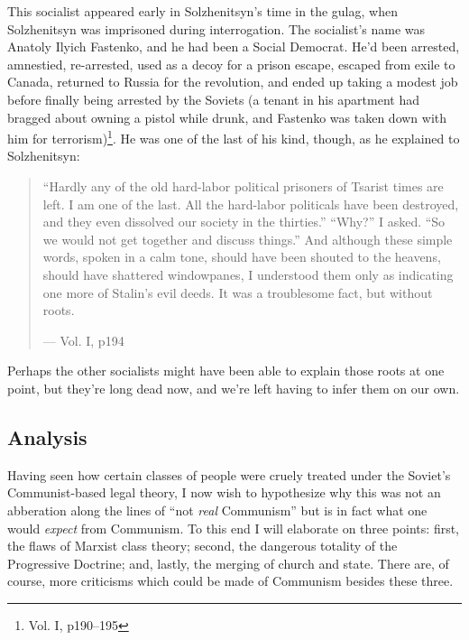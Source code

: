 \documentclass{article}
\begin{document}
This socialist appeared early in Solzhenitsyn's time in the gulag, when Solzhenitsyn was imprisoned during interrogation.  The socialist's name was Anatoly Ilyich Fastenko, and he had been a Social Democrat.  He'd been arrested, amnestied, re-arrested, used as a decoy for a prison escape, escaped from exile to Canada, returned to Russia for the revolution, and ended up taking a modest job before finally being arrested by the Soviets (a tenant in his apartment had bragged about owning a pistol while drunk, and Fastenko was taken down with him for terrorism)\footnote{Vol. I, p190--195}.  He was one of the last of his kind, though, as he explained to Solzhenitsyn:

\begin{quote}
``Hardly any of the old hard-labor political prisoners of Tsarist times are left.  I am one of the last.  All the hard-labor politicals have been destroyed, and they even dissolved our society in the thirties.''  ``Why?'' I asked.  ``So we would not get together and discuss things.'' And although these simple words, spoken in a calm tone, should have been shouted to the heavens, should have shattered windowpanes, I understood them only as indicating one more of Stalin's evil deeds.  It was a troublesome fact, but without roots.

--- Vol. I, p194
\end{quote}

Perhaps the other socialists might have been able to explain those roots at one point, but they're long dead now, and we're left having to infer them on our own.

\subsection{Analysis}
Having seen how certain classes of people were cruely treated under the Soviet's Communist-based legal theory, I now wish to hypothesize why this was not an abberation along the lines of ``not \emph{real} Communism'' but is in fact what one would \emph{expect} from Communism.  To this end I will elaborate on three points: first, the flaws of Marxist class theory; second, the dangerous totality of the Progressive Doctrine; and, lastly, the merging of church and state.  There are, of course, more criticisms which could be made of Communism besides these three.
\end{document}
